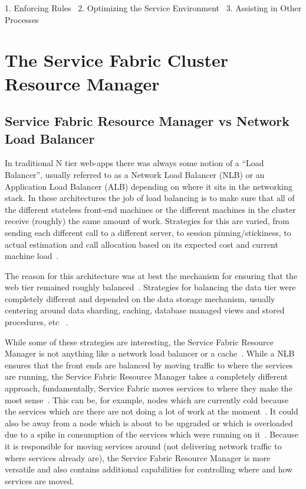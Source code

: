 1. Enforcing Rules~\cite{hid-sp18-501-fig2and3}
2. Optimizing the Service Environment~\cite{hid-sp18-501-fig2and3}
3. Assisting in Other Processes~\cite{hid-sp18-501-fig2and3}


\section{The Service Fabric Cluster Resource Manager}

\subsection{Service Fabric Resource Manager vs Network Load Balancer}

In traditional N tier web-apps there was always some notion of a ``Load
Balancer'', usually referred to as a Network Load Balancer (NLB) or an
Application Load Balancer (ALB) depending on where it sits in the
networking stack. In these architectures the job of load balancing is
to make sure that all of the different stateless front-end machines or
the different machines in the cluster receive (roughly) the same
amount of work. Strategies for this are varied, from sending each
different call to a different server, to session pinning/stickiness,
to actual estimation and call allocation based on its expected cost
and current machine load~\cite{hid-sp18-501-fig2and3}.

The reason for this architecture was at best the mechanism for
ensuring that the web tier remained roughly
balanced~\cite{hid-sp18-501-fig2and3}.  Strategies for balancing the
data tier were completely different and depended on the data storage
mechanism, usually centering around data sharding, caching, database
managed views and stored procedures, etc
~\cite{hid-sp18-501-fig2and3}.

While some of these strategies are interesting, the Service Fabric
Resource Manager is not anything like a network load balancer or a
cache~\cite{hid-sp18-501-fig2and3}. While a NLB ensures that the front
ends are balanced by moving traffic to where the services are running,
the Service Fabric Resource Manager takes a completely different approach, 
fundamentally, Service Fabric moves services to where they make the
most sense~\cite{hid-sp18-501-fig2and3}.  This can be, for example,
nodes which are currently cold because the services which are there
are not doing a lot of work at the moment~\cite{hid-sp18-501-fig2and3}.
It could also be away from a node which is about to be upgraded or
which is overloaded due to a spike in consumption of the services
which were running on it~\cite{hid-sp18-501-fig2and3}. Because it is
responsible for moving services around (not delivering network traffic
to where services already are), the Service Fabric Resource Manager is
more versatile and also contains additional capabilities for
controlling where and how services are moved.

